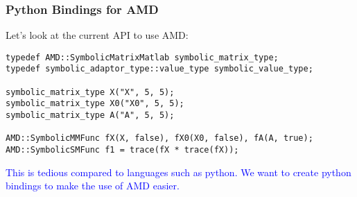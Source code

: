 \begin{frame}[fragile]
\frametitle{Python Bindings for AMD}
%
Let's look at the current API to use AMD:
%
\begin{lstlisting}[style=basic]
typedef AMD::SymbolicMatrixMatlab symbolic_matrix_type;
typedef symbolic_adaptor_type::value_type symbolic_value_type;

symbolic_matrix_type X("X", 5, 5); 
symbolic_matrix_type X0("X0", 5, 5); 
symbolic_matrix_type A("A", 5, 5);

AMD::SymbolicMMFunc fX(X, false), fX0(X0, false), fA(A, true);
AMD::SymbolicSMFunc f1 = trace(fX * trace(fX));
\end{lstlisting}

%
\begin{center}
\textcolor{blue}{This is tedious compared to languages such as python. We want
to create python bindings to make the use of AMD easier.}
\end{center}
%
\end{frame}
